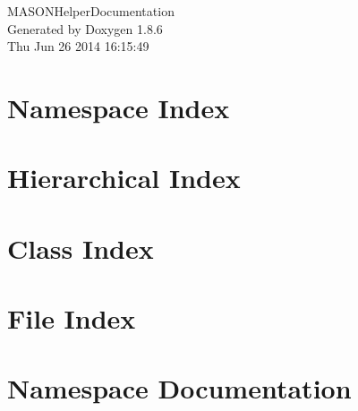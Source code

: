 \documentclass[twoside]{book}
\newcommand{\clearemptydoublepage}{%
  \newpage{\pagestyle{empty}\cleardoublepage}%
}
\begin{document}
\hypersetup{pageanchor=false}
\begin{titlepage}
\vspace*{7cm}
\begin{center}%
{\Large M\-A\-S\-O\-N\-Helper\-Documentation }\\
\vspace*{1cm}
{\large Generated by Doxygen 1.8.6}\\
\vspace*{0.5cm}
{\small Thu Jun 26 2014 16:15:49}\\
\end{center}
\end{titlepage}
\clearemptydoublepage
\tableofcontents
\clearemptydoublepage
{}
\hypersetup{pageanchor=true}

\chapter{Namespace Index}

\chapter{Hierarchical Index}

\chapter{Class Index}

\chapter{File Index}

\chapter{Namespace Documentation}














\end{document}
